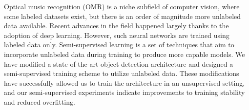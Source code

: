 \documentclass[12pt]{report}
\begin{document}

Optical music recognition (OMR) is a niche subfield of computer vision, where some labeled datasets exist, but there is an order of magnitude more unlabeled data available. Recent advances in the field happened largely thanks to the adoption of deep learning. However, such neural networks are trained using labeled data only. Semi-supervised learning is a set of techniques that aim to incorporate unlabeled data during training to produce more capable models. We have modified a state-of-the-art object detection architecture and designed a semi-supervised training scheme to utilize unlabeled data. These modifications have successfully allowed us to train the architecture in an unsupervised setting, and our semi-supervised experiments indicate improvements to training stability and reduced overfitting.
\end{document}
